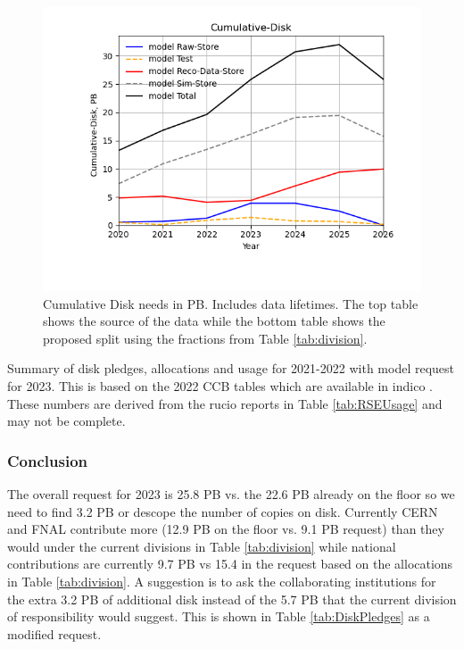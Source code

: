 \documentclass[12pt]{article}
\begin{document}
\begin{figure}[h]
\centering\includegraphics[height=0.5\textwidth]{MoreSim_2022-11-21-2026/MoreSim_2022-11-21-2026-Cumulative-Disk.png}
\caption{Cumulative Disk needs in PB. Includes data lifetimes.  The top table shows the source of the data while the bottom table  shows the proposed split using the fractions from Table \ref{tab:division}. }\label{fig:Cumulative-Disk}
\end{figure}




\begin{table}[ht]
\centering{}
\caption{Summary of disk pledges, allocations and usage for 2021-2022 with model request for 2023.  This is based on the 2022 CCB tables which are available in indico  \cite{CCB2022,CCB2023}.  These numbers are derived from the rucio reports in Table \ref{tab:RSEUsage} and may not be complete.  }
\label{tab:DiskPledges}
\end{table}

\subsubsection{Conclusion}\label{sec:diskresult}
The overall request for 2023 is 25.8 PB vs. the 22.6 PB already on the floor so we need to find 3.2 PB or descope the number of copies on disk. Currently CERN and FNAL contribute more  (12.9 PB on the floor vs. 9.1 PB request) than they would under the current divisions in Table \ref{tab:division} while national contributions are currently 9.7 PB vs 15.4 in the request based on the allocations in Table \ref{tab:division}.   A suggestion is to ask the collaborating institutions for the extra  3.2 PB of additional disk instead of the 5.7 PB that the current division of responsibility would suggest.  This is shown in Table \ref{tab:DiskPledges} as a modified request.
\end{document}
